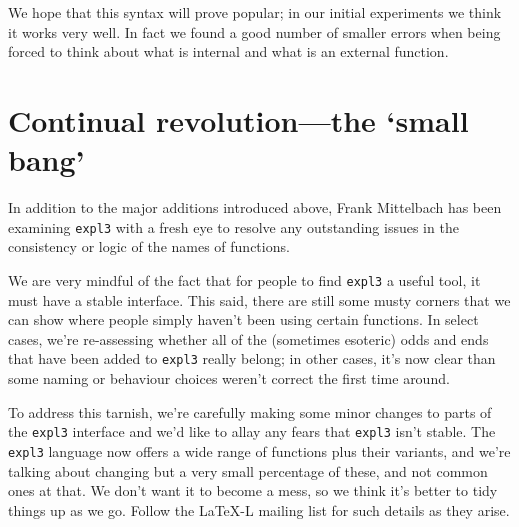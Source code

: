 \documentclass{ltnews}
\begin{document}
We hope that this syntax will prove popular; in our initial experiments we think it works very well. In fact we found a good number of smaller errors when being forced to think about what is internal and what is an external function.

\section{Continual revolution---the `small bang'}

In addition to the major additions introduced above, Frank Mittelbach has been examining \texttt{expl3} with a fresh eye to resolve any outstanding issues in the consistency or logic of the names of functions.

We are very mindful of the fact that for people to find \texttt{expl3} a useful tool, it must have a stable interface.
This said, there are still some musty corners that we can show where people simply haven't been using certain functions.
In select cases, we're re-assessing whether all of the (sometimes esoteric) odds and ends that have been added to \texttt{expl3} really belong; in other cases, it's now clear than some naming or behaviour choices weren't correct the first time around.

To address this tarnish, we're carefully making some minor changes to parts of the \texttt{expl3} interface and we'd like to allay any fears that \texttt{expl3} isn't stable.
The \texttt{expl3} language now offers a wide range of functions plus their variants, and we're talking about changing but a very small percentage of these, and not common ones at that.
We don't want it to become a mess, so we think it's better to tidy things up as we go.
Follow the LaTeX-L mailing list for such details as they arise.
\end{document}
